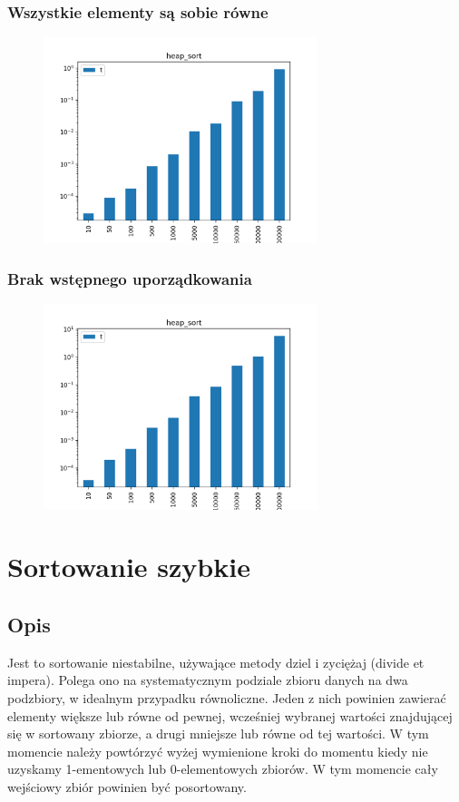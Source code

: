 \documentclass[]{article}
\begin{document}
		\subsubsection{Wszystkie elementy są sobie równe}
		\begin{figure}[H]
			\centering
			\includegraphics[width=8cm]{heap_sort_c.png}	
		\end{figure}
		\subsubsection{Brak wstępnego uporządkowania}
		\begin{figure}[H]
			\centering
			\includegraphics[width=8cm]{heap_sort_r.png}	
		\end{figure}
	
\pagebreak
\section{Sortowanie szybkie}
	\subsection{Opis}
		Jest to sortowanie niestabilne, używające metody dziel i zyciężaj (divide et impera). Polega ono na systematycznym podziale zbioru danych na dwa podzbiory, w idealnym przypadku równoliczne. Jeden z nich powinien zawierać elementy większe lub równe od pewnej, wcześniej wybranej wartości znajdującej się w sortowany zbiorze, a drugi mniejsze lub równe od tej wartości. W tym momencie należy powtórzyć wyżej wymienione kroki do momentu kiedy nie uzyskamy 1-ementowych lub 0-elementowych zbiorów. W tym momencie cały wejściowy zbiór powinien być posortowany.
\end{document}
